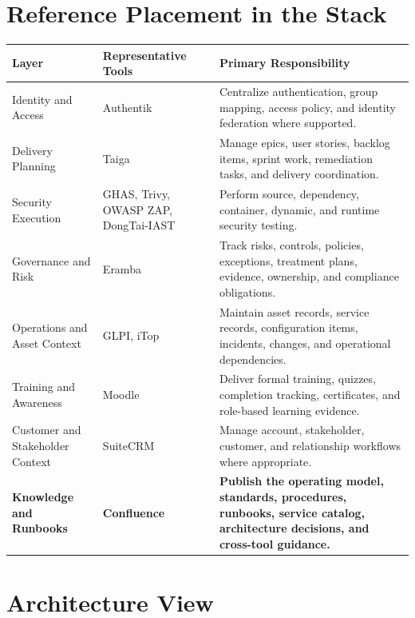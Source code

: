 \documentclass[10pt,letterpaper]{article}
\begin{document}
\section{Reference Placement in the Stack}

\begin{longtable}{L{1.35in} L{1.45in} L{3.65in}}
\toprule
\textbf{Layer} & \textbf{Representative Tools} & \textbf{Primary Responsibility} \\
\midrule
Identity and Access & Authentik & Centralize authentication, group mapping, access policy, and identity federation where supported. \\
Delivery Planning & Taiga & Manage epics, user stories, backlog items, sprint work, remediation tasks, and delivery coordination. \\
Security Execution & GHAS, Trivy, OWASP ZAP, DongTai-IAST & Perform source, dependency, container, dynamic, and runtime security testing. \\
Governance and Risk & Eramba & Track risks, controls, policies, exceptions, treatment plans, evidence, ownership, and compliance obligations. \\
Operations and Asset Context & GLPI, iTop & Maintain asset records, service records, configuration items, incidents, changes, and operational dependencies. \\
Training and Awareness & Moodle & Deliver formal training, quizzes, completion tracking, certificates, and role-based learning evidence. \\
Customer and Stakeholder Context & SuiteCRM & Manage account, stakeholder, customer, and relationship workflows where appropriate. \\
\textbf{Knowledge and Runbooks} & \textbf{Confluence} & \textbf{Publish the operating model, standards, procedures, runbooks, service catalog, architecture decisions, and cross-tool guidance.} \\
\bottomrule
\end{longtable}

\section{Architecture View}
\end{document}

